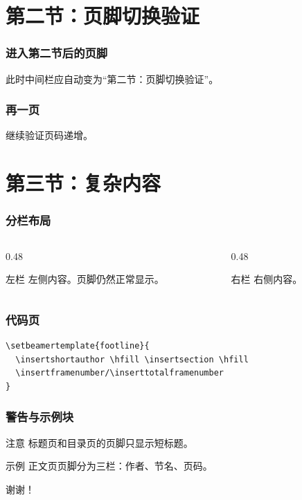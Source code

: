 \documentclass[aspectratio=169,11pt]{beamer}
\begin{document}
\section{第二节：页脚切换验证}

\begin{frame}
  \frametitle{进入第二节后的页脚}
  此时中间栏应自动变为“第二节：页脚切换验证”。
\end{frame}

\begin{frame}
  \frametitle{再一页}
  继续验证页码递增。
\end{frame}

\section{第三节：复杂内容}

\begin{frame}
  \frametitle{分栏布局}
  \begin{columns}[T]
    \begin{column}{0.48\textwidth}
      \begin{block}{左栏}
        左侧内容。页脚仍然正常显示。
      \end{block}
    \end{column}
    \begin{column}{0.48\textwidth}
      \begin{block}{右栏}
        右侧内容。
      \end{block}
    \end{column}
  \end{columns}
\end{frame}

\begin{frame}[fragile]
  \frametitle{代码页}
\begin{verbatim}
\setbeamertemplate{footline}{
  \insertshortauthor \hfill \insertsection \hfill
  \insertframenumber/\inserttotalframenumber
}
\end{verbatim}
\end{frame}

\begin{frame}
  \frametitle{警告与示例块}
  \begin{alertblock}{注意}
    标题页和目录页的页脚只显示短标题。
  \end{alertblock}
  \begin{exampleblock}{示例}
    正文页页脚分为三栏：作者、节名、页码。
  \end{exampleblock}
\end{frame}

\begin{frame}
  \thispagestyle{navigation@titlepage} %
  \centering
  \Huge 谢谢！
\end{frame}
\end{document}
